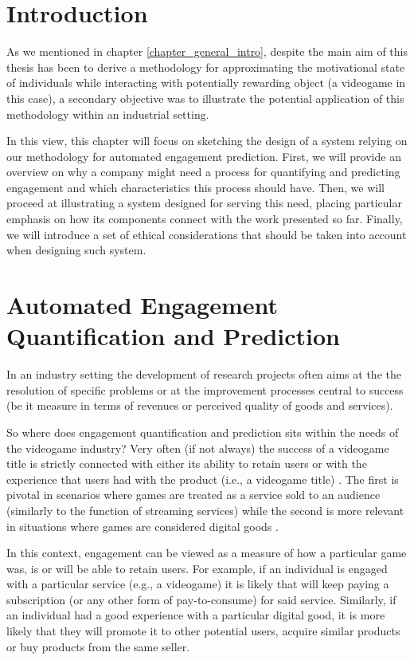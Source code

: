 \section{Introduction}
\label{industry_needs}
As we mentioned in chapter \ref{chapter_general_intro}, despite the main aim of this thesis has been to derive a methodology for approximating the motivational state of individuals while interacting with potentially rewarding object (a videogame in this case), a secondary objective was to illustrate the potential application of this methodology within an industrial setting. 

In this view, this chapter will focus on sketching the design of a system relying on our methodology for automated engagement prediction. First, we will provide an overview on why a company might need a process for quantifying and predicting engagement and which characteristics this process should have. Then, we will proceed at illustrating a system designed for serving this need, placing particular emphasis on how its components connect with the work presented so far. Finally, we will introduce a set of ethical considerations that should be taken into account when designing such system.

\section{Automated Engagement Quantification and Prediction}
\label{industry_needs}
In an industry setting the development of research projects often aims at the the resolution of specific problems or at the improvement processes central to success (be it measure in terms of revenues or perceived quality of goods and services). 

So where does engagement quantification and prediction sits within the needs of the videogame industry? Very often (if not always) the success of a videogame title is strictly connected with either its ability to retain users or with the experience that users had with the product (i.e., a videogame title) \cite{amit2001value, alomari2016mobile}. The first is pivotal in scenarios where games are treated as a service sold to an audience (similarly to the function of streaming services) while the second is more relevant in situations where games are considered digital goods \cite{amit2001value, alomari2016mobile}. 

In this context, engagement can be viewed as a measure of how a particular game was, is or will be able to retain users. For example, if an individual is engaged with a particular service (e.g., a videogame) it is likely that will keep paying a subscription (or any other form of pay-to-consume) for said service. Similarly, if an individual had a good experience with a particular digital good, it is more likely that they will promote it to other potential users, acquire similar products or buy products from the same seller.  

